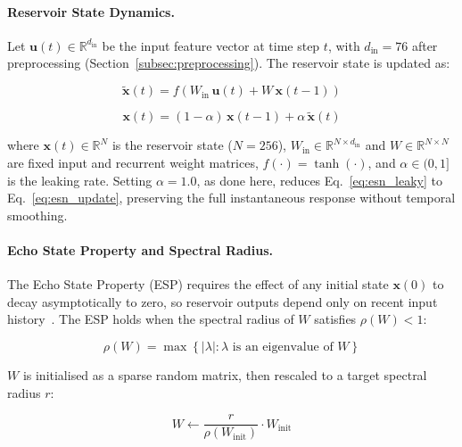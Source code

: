 \documentclass[5p,times]{elsarticle}
\begin{document}
	\paragraph{Reservoir State Dynamics.}
	Let $\mathbf{u}(t) \in \mathbb{R}^{d_{\mathrm{in}}}$ be the input
	feature vector at time step $t$, with $d_{\mathrm{in}} = 76$ after
	preprocessing (Section~\ref{subsec:preprocessing}). The reservoir
	state is updated as:
	
	\begin{equation}
		\tilde{\mathbf{x}}(t) =
		f\!\left(W_{\mathrm{in}}\,\mathbf{u}(t) +
		W\,\mathbf{x}(t-1)\right)
		\label{eq:esn_update}
	\end{equation}
	
	\begin{equation}
		\mathbf{x}(t) =
		(1-\alpha)\,\mathbf{x}(t-1) + \alpha\,\tilde{\mathbf{x}}(t)
		\label{eq:esn_leaky}
	\end{equation}
	
	\noindent where $\mathbf{x}(t) \in \mathbb{R}^{N}$ is the reservoir
	state ($N = 256$), $W_{\mathrm{in}} \in \mathbb{R}^{N \times
		d_{\mathrm{in}}}$ and $W \in \mathbb{R}^{N \times N}$ are fixed input
	and recurrent weight matrices, $f(\cdot) = \tanh(\cdot)$, and $\alpha
	\in (0,1]$ is the leaking rate. Setting $\alpha = 1.0$, as done here,
	reduces Eq.~\eqref{eq:esn_leaky} to Eq.~\eqref{eq:esn_update},
	preserving the full instantaneous response without temporal
	smoothing.
	
	\paragraph{Echo State Property and Spectral Radius.}
	The Echo State Property (ESP) requires the effect of any initial state
	$\mathbf{x}(0)$ to decay asymptotically to zero, so reservoir outputs
	depend only on recent input history~\cite{jaeger2001}. The ESP holds
	when the spectral radius of $W$ satisfies $\rho(W) < 1$:
	
	\begin{equation}
		\rho(W) =
		\max\!\left\{|\lambda| : \lambda \text{ is an eigenvalue of }
		W\right\}
		\label{eq:spectral}
	\end{equation}
	
	$W$ is initialised as a sparse random matrix, then rescaled to a
	target spectral radius $r$:
	
	\begin{equation}
		W \leftarrow
		\frac{r}{\rho(W_{\mathrm{init}})} \cdot W_{\mathrm{init}}
		\label{eq:rescale}
	\end{equation}
	
\end{document}
